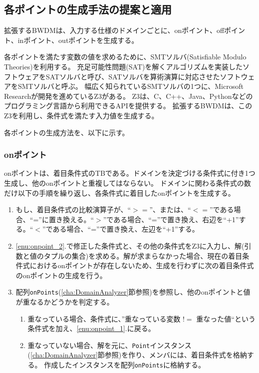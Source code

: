 \documentclass[uplatex, report, a4j, 10pt]{jsbook}
\newcommand\ttt[1]{\texttt{#1}}
\begin{document}
\subsection{各ポイントの生成手法の提案と適用}\label{cha:create_point}
拡張するBWDMは、入力する仕様のドメインごとに、onポイント、offポイント、inポイント、outポイントを生成する。

各ポイントを満たす変数の値を求めるために、SMTソルバ(Satisfiable Modulo Theories)\cite{sat}を利用する。
充足可能性問題(SAT)を解くアルゴリズムを実装したソフトウェアをSATソルバと呼び、SATソルバを算術演算に対応させたソフトウェアをSMTソルバと呼ぶ。
幅広く知られているSMTソルバの1つに、Microsoft Researchが開発を進めているZ3\cite{z3}がある。
Z3は、C、C++、Java、Pythonなどのプログラミング言語から利用できるAPIを提供する。
拡張するBWDMは、このZ3を利用し、条件式を満たす入力値を生成する。

各ポイントの生成方法を、以下に示す。

\subsubsection{onポイント}
onポイントは、着目条件式のTBである。ドメインを決定づける条件式に付き1つ生成し、他のonポイントと重複してはならない。
ドメインに関わる条件式の数だけ以下の手順を繰り返し、各条件式に着目したonポイントを生成する。
\begin{enumerate}
  \item\label{enu:onpoint_2} もし、着目条件式の比較演算子が、“$>=$”、または、“$<=$”である場合、“=”に置き換える。“$>$”である場合、“=”で置き換え、右辺を“+1”する。“$<$”である場合、“=”で置き換え、左辺を“+1”する。
  \item\label{enu:onpoint_1} \ref{enu:onpoint_2}.で修正した条件式と、その他の条件式をZ3に入力し、解(引数と値のタプルの集合)を求める。解が求まらなかった場合、現在の着目条件式におけるonポイントが存在しないため、生成を行わずに次の着目条件式のonポイントの生成を行う。
  \item 配列\ttt{onPoints}(\ref{cha:DomainAnalyzer}節参照)を参照し、他のonポイントと値が重なるかどうかを判定する。
        \begin{enumerate}
          \item 重なっている場合、条件式に、”重なっている変数 $!=$ 重なった値“という条件式を加え、\ref{enu:onpoint_1}.に戻る。
          \item 重なっていない場合、解を元に、\ttt{Point}インスタンス(\ref{cha:DomainAnalyzer}節参照)を作り、メンバ\forcusedConditionalExpression{}には、着目条件式を格納する。
                作成したインスタンスを配列\ttt{onPoints}に格納する。
        \end{enumerate}
\end{enumerate}
\end{document}
